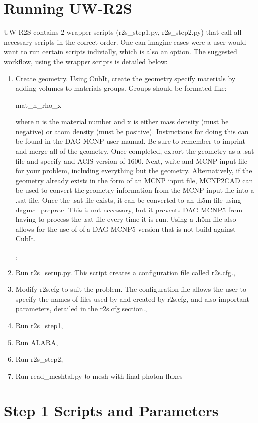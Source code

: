 \documentclass{article}
\begin{document}
\section{Running UW-R2S}
UW-R2S contains 2 wrapper scripts (r2s\_step1.py, r2s\_step2.py) that call all necessary scripts in the correct order. One can imagine cases were a user would want to run certain scripts indivially, which is also an option. The suggested workflow, using the wrapper scripts is detailed below:
\begin{enumerate}
\item{Create geometry. Using CubIt, create the geometry specify materials by adding volumes to materials groups. Groups should be formated like:

mat\_n\_rho\_x

where n is the material number and x is either mass density (must be negative) or atom density (must be positive). Instructions for doing this can be found in the DAG-MCNP user manual. Be sure to remember to imprint and merge all of the geometry. Once completed, export the geometry as a .sat file and specify and ACIS version of 1600. Next, write and MCNP input file for your problem, including everything but the geometry. Alternatively, if the geometry already exists in the form of an MCNP input file, MCNP2CAD can be used to convert the geometry information from the MCNP input file into a .sat file. Once the .sat file exists, it can be converted to an .h5m file using dagmc\_preproc. This is not necessary, but it prevents DAG-MCNP5 from having to process the .sat file every time it is run. Using a .h5m file also allows for the use of of a DAG-MCNP5 version that is not build against CubIt.},
\item{Run r2s\_setup.py. This script creates a configuration file called r2s.cfg.},
\item{Modify r2s.cfg to suit the problem. The configuration file allows the user to specify the names of files used by and created by r2s.cfg, and also important parameters, detailed in the r2s.cfg section.},
\item{Run r2s\_step1},
\item{Run ALARA},
\item{Run r2s\_step2},
\item{Run read\_meshtal.py to mesh with final photon fluxes}
\end{enumerate}

\section{Step 1 Scripts and Parameters}
\end{document}
